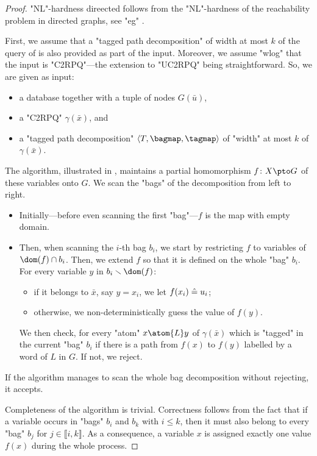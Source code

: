 \begin{proof}
	 "NL"-hardness direected follows from the "NL"-hardness of
	the reachability problem in directed graphs, see "eg" \cite[Theorem~4.18, p.~89]{AB09Computational}.

	First, we assume that a "tagged path decomposition" of width at most $k$ of the query of
	is also provided as part of the input. Moreover, we assume "wlog" that the input is "C2RPQ"---the extension to "UC2RPQ" being straightforward. So, we are given as input:
	\begin{itemize}
		\item a database together with a tuple of nodes $G(\bar u)$,
		\item a "C2RPQ" $\gamma(\bar x)$, and
		\item a "tagged path decomposition" $\langle T, \bagmap, \tagmap \rangle$ of "width" at 	
			most $k$ of $\gamma(\bar x)$.
	\end{itemize}
	The algorithm, illustrated in , maintains a partial homomorphism
	$f\colon X \pto G$
	of these variables onto $G$.
	We scan the "bags" of the decomposition from left to right.
	\begin{itemize}
		\item Initially---before even scanning the first "bag"---$f$ is the map with empty domain.
		\item Then, when scanning the $i$-th bag $b_i$,
			we start by restricting $f$ to variables of $\dom(f)\cap b_i$.
			Then, we extend $f$ so that it is defined on the whole "bag" $b_i$.
			For every variable $y$ in $b_i \smallsetminus\dom(f)$:
			\begin{itemize}
				\item if it belongs to $\bar x$, say $y = x_i$, 
					we let $f(x_i) \mathrel{\hat{=}} u_i$;
				\item otherwise, we non-deterministically guess the value of $f(y)$.
			\end{itemize}
			We then check, for every "atom" $x \atom{L} y$ of $\gamma(\bar x)$ which is "tagged" in 
			the current "bag" $b_i$ if there is a path from $f(x)$ to $f(y)$ labelled by a word of $L$ in $G$. If not, we reject. 
	\end{itemize}
	If the algorithm manages to scan the whole bag decomposition without rejecting, it accepts.

	Completeness of the algorithm is trivial. Correctness follows from the fact that if
	a variable occurs in "bags" $b_i$ and $b_k$ with $i \leq k$, then it must also belong to every
	"bag" $b_j$ for $j \in \lBrack i,k \rBrack$. As a consequence, a variable $x$ is assigned 
	exactly one value $f(x)$ during the whole process. 


\end{proof}
